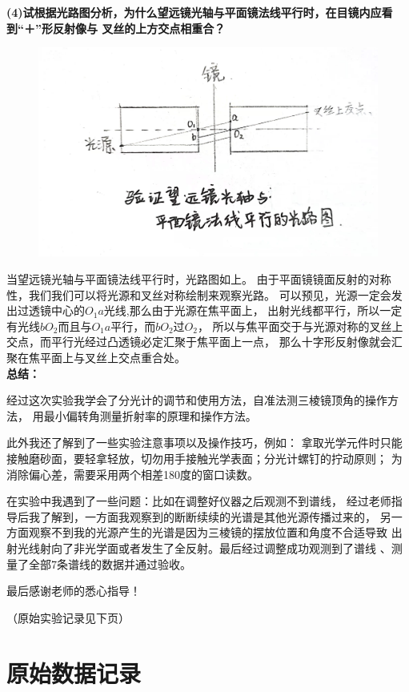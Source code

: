 \documentclass[UTF8]{ctexart}
\begin{document}
\noindent  \textbf{(4)试根据光路图分析，为什么望远镜光轴与平面镜法线平行时，在目镜内应看到“＋”形反射像与
叉丝的上方交点相重合？}

\begin{figure}[H]
    \centering
    \includegraphics[scale=0.06]{思考题光路.jpg}
\end{figure}

当望远镜光轴与平面镜法线平行时，光路图如上。
由于平面镜镜面反射的对称性，我们我们可以将光源和叉丝对称绘制来观察光路。
可以预见，光源一定会发出过透镜中心的$O_1a$光线,那么由于光源在焦平面上，
出射光线都平行，所以一定有光线$bO_2$而且与$O_1a$平行，而$bO_2$过$O_2$，
所以与焦平面交于与光源对称的叉丝上交点，而平行光经过凸透镜必定汇聚于焦平面上一点，
那么十字形反射像就会汇聚在焦平面上与叉丝上交点重合处。\\

\noindent  \textbf{总结：}

经过这次实验我学会了分光计的调节和使用方法，自准法测三棱镜顶角的操作方法，
用最小偏转角测量折射率的原理和操作方法。

此外我还了解到了一些实验注意事项以及操作技巧，例如：
拿取光学元件时只能接触磨砂面，要轻拿轻放，切勿用手接触光学表面；分光计螺钉的拧动原则；
为消除偏心差，需要采用两个相差180度的窗口读数。

在实验中我遇到了一些问题：比如在调整好仪器之后观测不到谱线，
经过老师指导后我了解到，一方面我观察到的断断续续的光谱是其他光源传播过来的，
另一方面观察不到我的光源产生的光谱是因为三棱镜的摆放位置和角度不合适导致
出射光线射向了非光学面或者发生了全反射。最后经过调整成功观测到了谱线
、测量了全部7条谱线的数据并通过验收。

最后感谢老师的悉心指导！

（原始实验记录见下页）

\section{原始数据记录}
\end{document}

